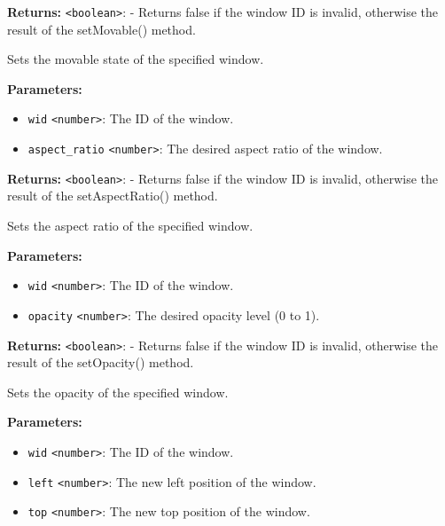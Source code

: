 \documentclass[12pt,a4paper]{article}
\begin{document}
\noindent \textbf{Returns:} \texttt{<boolean>}: - Returns false if the window ID is invalid, otherwise the result of the setMovable() method.

\noindent Sets the movable state of the specified window.

\vspace{5mm}
\noindent {}


\noindent \textbf{Parameters:}
\begin{itemize}
  \item \texttt{wid} \texttt{<number>}: The ID of the window.
  \item \texttt{aspect\_ratio} \texttt{<number>}: The desired aspect ratio of the window.
\end{itemize}

\noindent \textbf{Returns:} \texttt{<boolean>}: - Returns false if the window ID is invalid, otherwise the result of the setAspectRatio() method.

\noindent Sets the aspect ratio of the specified window.

\vspace{5mm}
\noindent {}


\noindent \textbf{Parameters:}
\begin{itemize}
  \item \texttt{wid} \texttt{<number>}: The ID of the window.
  \item \texttt{opacity} \texttt{<number>}: The desired opacity level (0 to 1).
\end{itemize}

\noindent \textbf{Returns:} \texttt{<boolean>}: - Returns false if the window ID is invalid, otherwise the result of the setOpacity() method.

\noindent Sets the opacity of the specified window.

\vspace{5mm}
\noindent {}


\noindent \textbf{Parameters:}
\begin{itemize}
  \item \texttt{wid} \texttt{<number>}: The ID of the window.
  \item \texttt{left} \texttt{<number>}: The new left position of the window.
  \item \texttt{top} \texttt{<number>}: The new top position of the window.
\end{itemize}
\end{document}
